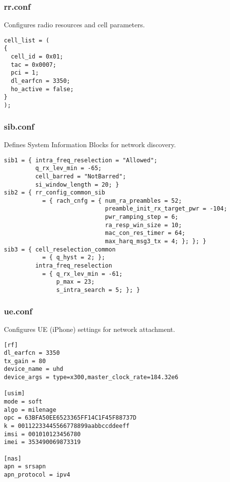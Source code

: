 \documentclass{article}
\begin{document}
\subsubsection{rr.conf}
Configures radio resources and cell parameters.
\begin{lstlisting}
cell_list = (
{
  cell_id = 0x01;
  tac = 0x0007;
  pci = 1;
  dl_earfcn = 3350;
  ho_active = false;
}
);
\end{lstlisting}

\subsubsection{sib.conf}
Defines System Information Blocks for network discovery.
\begin{lstlisting}
sib1 = { intra_freq_reselection = "Allowed";
         q_rx_lev_min = -65;
         cell_barred = "NotBarred";
         si_window_length = 20; }
sib2 = { rr_config_common_sib
           = { rach_cnfg = { num_ra_preambles = 52;
                             preamble_init_rx_target_pwr = -104;
                             pwr_ramping_step = 6;
                             ra_resp_win_size = 10;
                             mac_con_res_timer = 64;
                             max_harq_msg3_tx = 4; }; }; }
sib3 = { cell_reselection_common
           = { q_hyst = 2; };
         intra_freq_reselection
           = { q_rx_lev_min = -61;
               p_max = 23;
               s_intra_search = 5; }; }
\end{lstlisting}

\subsubsection{ue.conf}
Configures UE (iPhone) settings for network attachment.
\begin{lstlisting}
[rf]
dl_earfcn = 3350
tx_gain = 80
device_name = uhd
device_args = type=x300,master_clock_rate=184.32e6

[usim]
mode = soft
algo = milenage
opc = 63BFA50EE6523365FF14C1F45F88737D
k = 00112233445566778899aabbccddeeff
imsi = 001010123456780
imei = 353490069873319

[nas]
apn = srsapn
apn_protocol = ipv4
\end{lstlisting}
\end{document}
